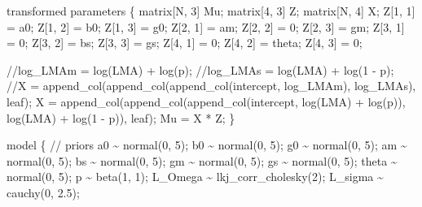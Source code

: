\documentclass[
  12pt,
  letterpaper,
  DIV=11,
  numbers=noendperiod]{scrartcl}
\newenvironment{Shaded}{\begin{snugshade}}{\end{snugshade}}
\newcommand{\CommentTok}[1]{\textcolor[rgb]{0.37,0.37,0.37}{#1}}
\newcommand{\DataTypeTok}[1]{\textcolor[rgb]{0.68,0.00,0.00}{#1}}
\newcommand{\DecValTok}[1]{\textcolor[rgb]{0.68,0.00,0.00}{#1}}
\newcommand{\FloatTok}[1]{\textcolor[rgb]{0.68,0.00,0.00}{#1}}
\newcommand{\KeywordTok}[1]{\textcolor[rgb]{0.00,0.23,0.31}{#1}}
\newcommand{\NormalTok}[1]{\textcolor[rgb]{0.00,0.23,0.31}{#1}}
\begin{document}
\begin{Shaded}
\begin{Highlighting}[]
\KeywordTok{transformed parameters}\NormalTok{ \{}
  \DataTypeTok{matrix}\NormalTok{[N, }\DecValTok{3}\NormalTok{] Mu;}
  \DataTypeTok{matrix}\NormalTok{[}\DecValTok{4}\NormalTok{, }\DecValTok{3}\NormalTok{] Z;}
  \DataTypeTok{matrix}\NormalTok{[N, }\DecValTok{4}\NormalTok{] X;}
\NormalTok{  Z[}\DecValTok{1}\NormalTok{, }\DecValTok{1}\NormalTok{] = a0;}
\NormalTok{  Z[}\DecValTok{1}\NormalTok{, }\DecValTok{2}\NormalTok{] = b0;}
\NormalTok{  Z[}\DecValTok{1}\NormalTok{, }\DecValTok{3}\NormalTok{] = g0;}
\NormalTok{  Z[}\DecValTok{2}\NormalTok{, }\DecValTok{1}\NormalTok{] = am;}
\NormalTok{  Z[}\DecValTok{2}\NormalTok{, }\DecValTok{2}\NormalTok{] = }\DecValTok{0}\NormalTok{;}
\NormalTok{  Z[}\DecValTok{2}\NormalTok{, }\DecValTok{3}\NormalTok{] = gm;}
\NormalTok{  Z[}\DecValTok{3}\NormalTok{, }\DecValTok{1}\NormalTok{] = }\DecValTok{0}\NormalTok{;}
\NormalTok{  Z[}\DecValTok{3}\NormalTok{, }\DecValTok{2}\NormalTok{] = bs;}
\NormalTok{  Z[}\DecValTok{3}\NormalTok{, }\DecValTok{3}\NormalTok{] = gs;}
\NormalTok{  Z[}\DecValTok{4}\NormalTok{, }\DecValTok{1}\NormalTok{] = }\DecValTok{0}\NormalTok{;}
\NormalTok{  Z[}\DecValTok{4}\NormalTok{, }\DecValTok{2}\NormalTok{] = theta;}
\NormalTok{  Z[}\DecValTok{4}\NormalTok{, }\DecValTok{3}\NormalTok{] = }\DecValTok{0}\NormalTok{;}

  \CommentTok{//log\_LMAm = log(LMA) + log(p);}
  \CommentTok{//log\_LMAs = log(LMA) + log(1 {-} p);}
  \CommentTok{//X = append\_col(append\_col(append\_col(intercept, log\_LMAm), log\_LMAs), leaf);}
\NormalTok{  X = append\_col(append\_col(append\_col(intercept,}
\NormalTok{    log(LMA) + log(p)),}
\NormalTok{    log(LMA) + log(}\DecValTok{1}\NormalTok{ {-} p)),}
\NormalTok{    leaf);}
\NormalTok{  Mu = X * Z;}
\NormalTok{\}}

\KeywordTok{model}\NormalTok{ \{}
  \CommentTok{// priors}
\NormalTok{  a0 \textasciitilde{} normal(}\DecValTok{0}\NormalTok{, }\DecValTok{5}\NormalTok{);}
\NormalTok{  b0 \textasciitilde{} normal(}\DecValTok{0}\NormalTok{, }\DecValTok{5}\NormalTok{);}
\NormalTok{  g0 \textasciitilde{} normal(}\DecValTok{0}\NormalTok{, }\DecValTok{5}\NormalTok{);}
\NormalTok{  am \textasciitilde{} normal(}\DecValTok{0}\NormalTok{, }\DecValTok{5}\NormalTok{);}
\NormalTok{  bs \textasciitilde{} normal(}\DecValTok{0}\NormalTok{, }\DecValTok{5}\NormalTok{);}
\NormalTok{  gm \textasciitilde{} normal(}\DecValTok{0}\NormalTok{, }\DecValTok{5}\NormalTok{);}
\NormalTok{  gs \textasciitilde{} normal(}\DecValTok{0}\NormalTok{, }\DecValTok{5}\NormalTok{);}
\NormalTok{  theta \textasciitilde{} normal(}\DecValTok{0}\NormalTok{, }\DecValTok{5}\NormalTok{);}
\NormalTok{  p \textasciitilde{} beta(}\DecValTok{1}\NormalTok{, }\DecValTok{1}\NormalTok{);}
\NormalTok{  L\_Omega \textasciitilde{} lkj\_corr\_cholesky(}\DecValTok{2}\NormalTok{);}
\NormalTok{  L\_sigma \textasciitilde{} cauchy(}\DecValTok{0}\NormalTok{, }\FloatTok{2.5}\NormalTok{);}


\end{Highlighting}
\end{Shaded}
\end{document}
